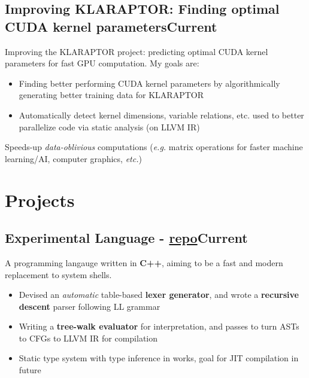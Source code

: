\documentclass[9pt]{article}
\begin{document}
\subsection{Improving KLARAPTOR: Finding optimal CUDA kernel parameters\hfill \normalsize\textnormal{Current}}
Improving the KLARAPTOR project: predicting optimal CUDA kernel parameters for fast GPU computation. My goals are:
\vspace{-0.5em}
\begin{itemize}
  \item Finding better performing CUDA kernel parameters by algorithmically generating better training data for KLARAPTOR
  \item Automatically detect kernel dimensions, variable relations, etc. used to better parallelize code via static analysis (on LLVM IR)
\end{itemize}
\vspace{-0.5em}
Speeds-up \textit{data-oblivious} computations (\textit{e.g.} matrix operations for faster machine learning/AI, computer graphics, \textit{etc.})

\section*{Projects}

\subsection{Experimental Language \normalsize\textnormal{- \href{https://github.com/ianayl/compiler}{repo}}\hfill \normalsize\textnormal{Current}}
A programming langauge written in \textbf{C++}, aiming to be a fast and modern replacement to system shells.
\vspace{-0.5em}
\begin{itemize}
  \item Devised an \textit{automatic} table-based \textbf{lexer generator}, and wrote a \textbf{recursive descent} parser following LL grammar
  \item Writing a \textbf{tree-walk evaluator} for interpretation, and passes to turn ASTs to CFGs to LLVM IR for compilation
  \item Static type system with type inference in works, goal for JIT compilation in future
\end{itemize}
\end{document}
